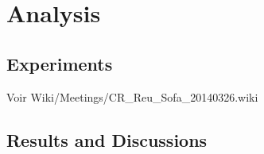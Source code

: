 \section{Analysis}
\label{sec:sofa}

\subsection{Experiments}


Voir Wiki/Meetings/CR\_Reu\_Sofa\_20140326.wiki


\subsection{Results and Discussions}

